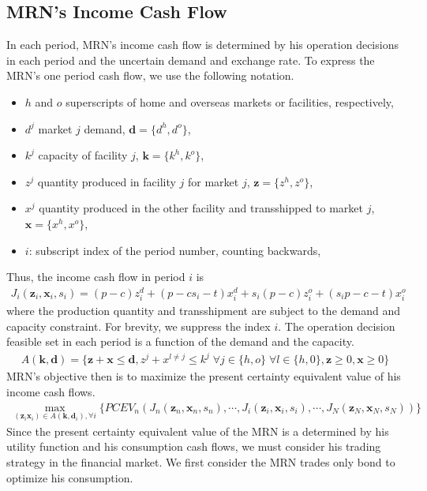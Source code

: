 \documentclass{article}[12pt letter]
\begin{document}
\subsection{MRN's Income Cash Flow}
In each period, MRN's income cash flow is determined by his operation decisions in each period and the uncertain demand and exchange rate. To express the MRN's one period cash flow, we use the following notation.
\begin{itemize}
    \item $h$ and $o$ superscripts of home and overseas markets or facilities, respectively,
    \item $d^j$ market $j$ demand, $\bm{d} = \{d^h, d^o \} $,
    \item $k^j$ capacity of facility $j$,   $\bm{k} = \{k^h,k^o\}$,
    \item $z^{j}$ quantity produced in facility $j$ for market $j$, $\bm{z} = \{z^{h},z^o\}$,
    \item $x^{j}$ quantity produced in the other facility and transshipped to market $j$, $\bm{x} = \{x^h,x^o\}$,
    \item $i$:  subscript index of the period number, counting backwards,
\end{itemize} 
Thus, the income cash flow in period $i$ is
\begin{align}
J_i(\bm{z}_i,\bm{x}_i, s_i) =  (p-c)z_i^{d}+ (p-cs_i-t)x_i^{d} + s_i(p-c)z_i^{o}+(s_i p-c-t)x_i^{o} 
\end{align}
where the production quantity and transshipment are subject to the demand and capacity constraint. For brevity, we suppress the index $i$. The operation decision feasible set in each period is a function of the demand and the capacity.
\begin{align}
A(\bm{k},\bm{d}) = \{\bm{z} + \bm{x} \leq \bm{d}, z^j + x^{l \neq j} \leq k^j \; \forall j \in\{h,o\}\; \forall l \in \{h,0\} , \bm{z}\geq 0, \bm{x} \geq 0\}
\end{align}
MRN's objective then is to maximize the present certainty equivalent value of his income cash flows.
\begin{align}
\max_{(\bm{z}_i\bm{x}_i) \in A(\bm{k},\bm{d}_i), \forall i}\{PCEV_n(J_n(\bm{z}_n,\bm{x}_n,s_n),\cdots, J_i(\bm{z}_i,\bm{x}_i,s_i), \cdots, J_N(\bm{z}_N,\bm{x}_N,s_N))\} \end{align}
Since the present certainty equivalent value of the MRN is a determined by his utility function and his consumption cash flows, we must consider his trading strategy in the financial market. We first consider the MRN trades only bond to optimize his consumption.
\end{document}
